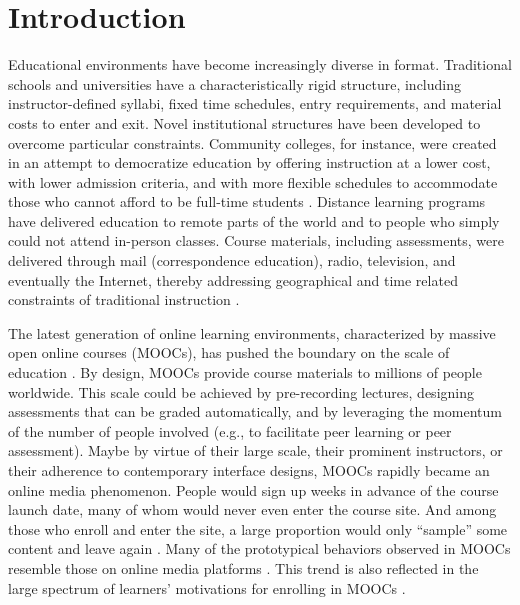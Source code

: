 \documentclass{sigchi}\usepackage[]{graphicx}\usepackage[]{color}
\begin{document}
\section{Introduction}

Educational environments have become increasingly diverse in format. Traditional schools and universities have a characteristically rigid structure, including instructor-defined syllabi, fixed time schedules, entry requirements, and material costs to enter and exit. Novel institutional structures have been developed to overcome particular constraints. Community colleges, for instance, were created in an attempt to democratize education by offering instruction at a lower cost, with lower admission criteria, and with more flexible schedules to accommodate those who cannot afford to be full-time students \cite{goldrick2010challenges}. Distance learning programs have delivered education to remote parts of the world and to people who simply could not attend in-person classes. Course materials, including assessments, were delivered through mail (correspondence education), radio, television, and eventually the Internet, thereby addressing geographical and time related constraints of traditional instruction \cite{moore1996distance}.

The latest generation of online learning environments, characterized by massive open online courses (MOOCs), has pushed the boundary on the scale of education \cite{waldrop2013campus}. By design, MOOCs provide course materials to millions of people worldwide. This scale could be achieved by pre-recording lectures, designing assessments that can be graded automatically, and by leveraging the momentum of the number of people involved (e.g., to facilitate peer learning or peer assessment). Maybe by virtue of their large scale, their prominent instructors, or their adherence to contemporary interface designs, MOOCs rapidly became an online media phenomenon. People would sign up weeks in advance of the course launch date, many of whom would never even enter the course site. And among those who enroll and enter the site, a large proportion would only ``sample'' some content and leave again \cite{kizilcec2013deconstructing}. Many of the prototypical behaviors observed in MOOCs resemble those on online media platforms \cite{kizilcec2013deconstructing,breslow2013studying}. This trend is also reflected in the large spectrum of learners' motivations for enrolling in MOOCs \cite{kizilcec2015motivation}.
\end{document}
